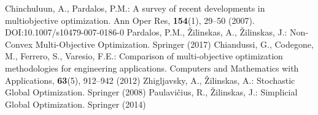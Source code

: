 \documentclass[smallcondensed]{svjour3}     %
\begin{document}
\begin{thebibliography}{}
	Chinchuluun, A., Pardalos, P.M.: A survey of recent developments in multiobjective optimization. Ann Oper Res, \textbf{154}(1), 29--50 (2007). DOI:10.1007/s10479-007-0186-0
	Pardalos, P.M., {\v Z}ilinskas, A., {\v Z}ilinskas, J.: Non-Convex Multi-Objective Optimization. Springer (2017)
	Chiandussi, G., Codegone, M., Ferrero, S., Varesio, F.E.: Comparison of multi-objective optimization methodologies for engineering applications. Computers and Mathematics with Applications, \textbf{63}(5), 912--942 (2012)
	Zhigljavsky, A., {\v Z}ilinskas, A.: Stochastic Global Optimization. Springer (2008)
	Paulavi{\v c}ius, R., {\v Z}ilinskas, J.: Simplicial Global Optimization. Springer (2014)


\end{thebibliography}
\end{document}

